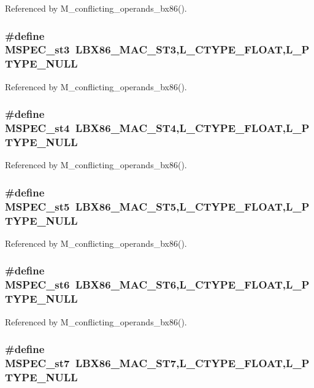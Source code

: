 Referenced by M\_\-conflicting\_\-operands\_\-bx86().
\subsubsection{\setlength{\rightskip}{0pt plus 5cm}\#define MSPEC\_\-st3~LBX86\_\-MAC\_\-ST3,L\_\-CTYPE\_\-FLOAT,L\_\-PTYPE\_\-NULL}\label{ml__bx86_8c_726b788127e2d0c74d576f0a52cd1c45}




Referenced by M\_\-conflicting\_\-operands\_\-bx86().
\subsubsection{\setlength{\rightskip}{0pt plus 5cm}\#define MSPEC\_\-st4~LBX86\_\-MAC\_\-ST4,L\_\-CTYPE\_\-FLOAT,L\_\-PTYPE\_\-NULL}\label{ml__bx86_8c_ed304216028edf8f45de56b7a991376d}




Referenced by M\_\-conflicting\_\-operands\_\-bx86().
\subsubsection{\setlength{\rightskip}{0pt plus 5cm}\#define MSPEC\_\-st5~LBX86\_\-MAC\_\-ST5,L\_\-CTYPE\_\-FLOAT,L\_\-PTYPE\_\-NULL}\label{ml__bx86_8c_152e5c65a6b4d66d1bb68de6f6dc0499}




Referenced by M\_\-conflicting\_\-operands\_\-bx86().
\subsubsection{\setlength{\rightskip}{0pt plus 5cm}\#define MSPEC\_\-st6~LBX86\_\-MAC\_\-ST6,L\_\-CTYPE\_\-FLOAT,L\_\-PTYPE\_\-NULL}\label{ml__bx86_8c_45dc28d5ebbd84c4c2b21f2befbe4297}




Referenced by M\_\-conflicting\_\-operands\_\-bx86().
\subsubsection{\setlength{\rightskip}{0pt plus 5cm}\#define MSPEC\_\-st7~LBX86\_\-MAC\_\-ST7,L\_\-CTYPE\_\-FLOAT,L\_\-PTYPE\_\-NULL}\label{ml__bx86_8c_334b70602864fa163f41687b4e79fe40}




